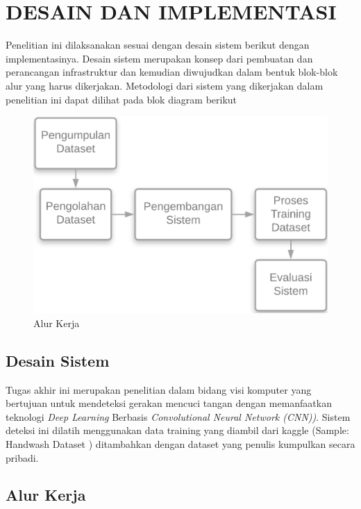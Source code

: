 \chapter{DESAIN DAN IMPLEMENTASI}
\label{chap:desainimplementasi}


Penelitian ini dilaksanakan sesuai dengan desain sistem berikut dengan implementasinya. Desain sistem merupakan konsep dari pembuatan dan perancangan infrastruktur dan kemudian diwujudkan dalam bentuk blok-blok alur yang harus dikerjakan. Metodologi dari sistem yang dikerjakan dalam penelitian ini dapat dilihat pada blok diagram berikut

\begin{figure}[ht]
	\centering
	
	\includegraphics[width=0.7\columnwidth]{gambar/AlurKerja.png}
	
	\caption{Alur Kerja}
	\label{fig:blokdiagram}
\end{figure}

\section{Desain Sistem}
\label{sec:desasinsistem}

Tugas akhir ini merupakan penelitian dalam bidang visi komputer yang bertujuan untuk mendeteksi gerakan mencuci tangan dengan memanfaatkan teknologi \textit{Deep Learning} Berbasis \textit{Convolutional Neural Network (CNN))}. Sistem deteksi ini dilatih menggunakan data training yang diambil dari kaggle (Sample: Handwash Dataset \cite{cit:kaggledata}) ditambahkan dengan dataset yang penulis kumpulkan secara pribadi. 

\section{Alur Kerja}
\label{sec:alurkerja}

